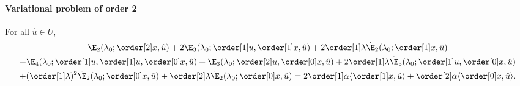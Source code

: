 \paragraph{Variational problem of order 2} For all $\hat{u} \in U$,
\begin{multline*}
    \E_2(\lambda_0; \order[2]x, \hat{u})
    + 2\E_3(\lambda_0; \order[1]u, \order[1]x, \hat{u})
    + 2 \order[1]\lambda \dot{\E}_2(\lambda_0; \order[1]x, \hat{u})\\
    + \E_4(\lambda_0; \order[1]u, \order[1]u, \order[0]x, \hat{u})
    + \E_3(\lambda_0; \order[2]u, \order[0]x, \hat{u})
    + 2\order[1]\lambda \dot{\E}_3(\lambda_0; \order[1]u, \order[0]x, \hat{u})\\
    + ( \order[1]\lambda )^2 \ddot{\E}_2(\lambda_0; \order[0]x, \hat{u})
    + \order[2]\lambda \dot{\E}_2(\lambda_0; \order[0]x, \hat{u})
    = 2 \order[1]\alpha \langle \order[1]x, \hat{u} \rangle
    + \order[2]\alpha \langle \order[0]x, \hat{u} \rangle.
\end{multline*}

